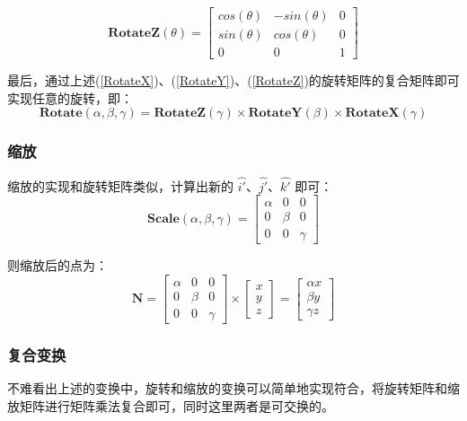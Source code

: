 \documentclass[12pt,oneside,a4paper]{ctexart}
\begin{document}
\begin{equation}
	\mathbf{RotateZ}(\theta)=\begin{bmatrix}
		cos(\theta) & -sin(\theta) & 0 \\
		sin(\theta) & cos(\theta)  & 0 \\
		0           & 0            & 1
	\end{bmatrix}
	\label{RotateZ}
\end{equation}

最后，通过上述(\ref{RotateX})、(\ref{RotateY})、(\ref{RotateZ})的旋转矩阵的复合矩阵即可实现任意的旋转，即：
\begin{equation*}
	\mathbf{Rotate}(\alpha,\beta,\gamma)=\mathbf{RotateZ}(\gamma)\times{}\mathbf{RotateY}(\beta)\times{}\mathbf{RotateX}(\gamma)
\end{equation*}
\subsubsection{缩放}

缩放的实现和旋转矩阵类似，计算出新的 $\hat{i'}$、$\hat{j'}$、$\hat{k'}$ 即可：
\begin{equation*}
	\mathbf{Scale}(\alpha,\beta,\gamma)=\begin{bmatrix}
		\alpha & 0     & 0      \\
		0      & \beta & 0      \\
		0      & 0     & \gamma
	\end{bmatrix}
\end{equation*}

则缩放后的点为：
\begin{equation*}
	\mathbf{N}=\begin{bmatrix}
		\alpha & 0     & 0      \\
		0      & \beta & 0      \\
		0      & 0     & \gamma
	\end{bmatrix}
	\times
	\begin{bmatrix}
		x \\
		y \\
		z
	\end{bmatrix}=
	\begin{bmatrix}
		\alpha{}x \\
		\beta{}y  \\
		\gamma{}z
	\end{bmatrix}
\end{equation*}

\subsubsection{复合变换}
不难看出上述的变换中，旋转和缩放的变换可以简单地实现符合，将旋转矩阵和缩放矩阵进行矩阵乘法复合即可，同时这里两者是可交换的。
\end{document}
